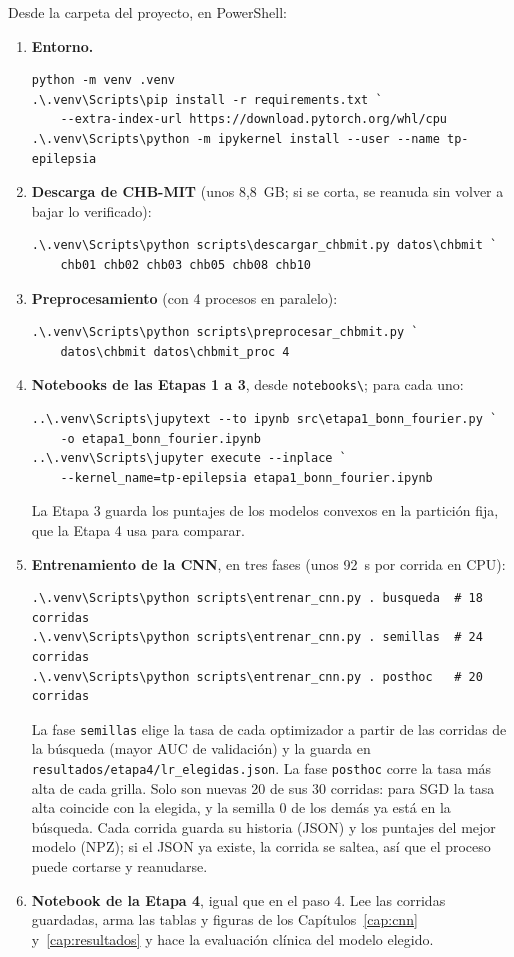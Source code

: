 Desde la carpeta del proyecto, en PowerShell:
\begin{enumerate}
  \item \textbf{Entorno.}
\begin{verbatim}
python -m venv .venv
.\.venv\Scripts\pip install -r requirements.txt `
    --extra-index-url https://download.pytorch.org/whl/cpu
.\.venv\Scripts\python -m ipykernel install --user --name tp-epilepsia
\end{verbatim}
  \item \textbf{Descarga de CHB-MIT} (unos 8,8~GB; si se corta, se reanuda sin volver a bajar lo verificado):
\begin{verbatim}
.\.venv\Scripts\python scripts\descargar_chbmit.py datos\chbmit `
    chb01 chb02 chb03 chb05 chb08 chb10
\end{verbatim}
  \item \textbf{Preprocesamiento} (con 4 procesos en paralelo):
\begin{verbatim}
.\.venv\Scripts\python scripts\preprocesar_chbmit.py `
    datos\chbmit datos\chbmit_proc 4
\end{verbatim}
  \item \textbf{Notebooks de las Etapas 1 a 3}, desde \texttt{notebooks\textbackslash}; para cada uno:
\begin{verbatim}
..\.venv\Scripts\jupytext --to ipynb src\etapa1_bonn_fourier.py `
    -o etapa1_bonn_fourier.ipynb
..\.venv\Scripts\jupyter execute --inplace `
    --kernel_name=tp-epilepsia etapa1_bonn_fourier.ipynb
\end{verbatim}
        La Etapa 3 guarda los puntajes de los modelos convexos en la partición fija, que la Etapa 4 usa para comparar.
  \item \textbf{Entrenamiento de la CNN}, en tres fases (unos 92~s por corrida en CPU):
\begin{verbatim}
.\.venv\Scripts\python scripts\entrenar_cnn.py . busqueda  # 18 corridas
.\.venv\Scripts\python scripts\entrenar_cnn.py . semillas  # 24 corridas
.\.venv\Scripts\python scripts\entrenar_cnn.py . posthoc   # 20 corridas
\end{verbatim}
        La fase \texttt{semillas} elige la tasa de cada optimizador a partir de las corridas de la búsqueda (mayor AUC de
        validación) y la guarda en \texttt{resultados/etapa4/lr\_elegidas.json}. La fase \texttt{posthoc} corre la tasa
        más alta de cada grilla. Solo son nuevas 20 de sus 30 corridas: para SGD la tasa alta coincide con la elegida, y la
        semilla 0 de los demás ya está en la búsqueda. Cada corrida guarda su historia (JSON) y los puntajes del mejor modelo (NPZ); si el JSON ya
        existe, la corrida se saltea, así que el proceso puede cortarse y reanudarse.
  \item \textbf{Notebook de la Etapa 4}, igual que en el paso 4. Lee las corridas guardadas, arma las tablas y figuras de los
        Capítulos~\ref{cap:cnn} y~\ref{cap:resultados} y hace la evaluación clínica del modelo elegido.
\end{enumerate}

